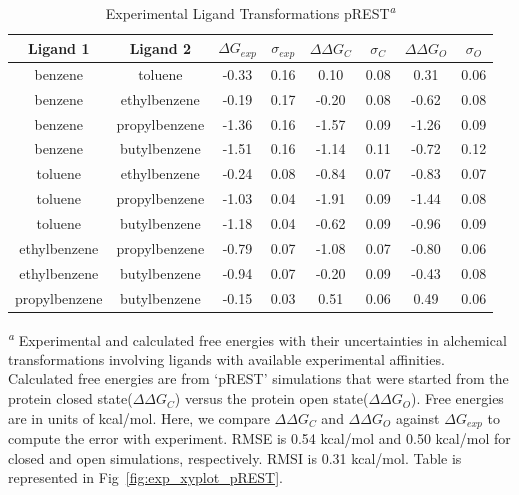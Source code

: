 \begin{table}[!htb]
\centering
\caption{Experimental Ligand Transformations pREST\textsuperscript{\emph{a}}}
\label{tbl:exp_pREST_set}
\begin{tabular}{|c|c|c|c|c|c|c|c|}
\hline
\textbf{Ligand 1} & \textbf{Ligand 2} & \boldmath$\Delta G_{exp}$  & \boldmath$\sigma_{exp}$ & \boldmath$\Delta\Delta G_{C}$ & \boldmath$\sigma_{C}$ & \boldmath$\Delta\Delta G_{O}$ & \boldmath$\sigma_{O}$ \\ \hline
benzene         & toluene         & -0.33 & 0.16  & 0.10  & 0.08  & 0.31  & 0.06          \\ \hline
benzene         & ethylbenzene    &-0.19  & 0.17  & -0.20 & 0.08  & -0.62 & 0.08          \\ \hline
benzene         & propylbenzene & -1.36 & 0.16  & -1.57 & 0.09  & -1.26 & 0.09         \\ \hline
benzene         & butylbenzene  & -1.51 & 0.16  & -1.14 & 0.11  & -0.72 & 0.12         \\ \hline
toluene         & ethylbenzene    & -0.24 & 0.08  & -0.84 & 0.07  & -0.83 & 0.07          \\ \hline
toluene         & propylbenzene & -1.03 & 0.04  & -1.91 & 0.09  & -1.44 & 0.08          \\ \hline
toluene         & butylbenzene  & -1.18 & 0.04  & -0.62 & 0.09  & -0.96 & 0.09          \\ \hline
ethylbenzene    & propylbenzene & -0.79 & 0.07  & -1.08 & 0.07  & -0.80 & 0.06         \\ \hline
ethylbenzene    & butylbenzene  & -0.94 & 0.07  & -0.20 & 0.09  & -0.43 & 0.08         \\ \hline
propylbenzene & butylbenzene  & -0.15 & 0.03  & 0.51  & 0.06  & 0.49  & 0.06       \\ \hline
\end{tabular}

\textsuperscript{\emph{a}} Experimental and calculated free energies with their uncertainties in alchemical transformations involving ligands with available experimental affinities.
Calculated free energies are from `pREST' simulations that were started from the protein closed state(\boldmath$\Delta\Delta G_{C}$) versus the protein open state(\boldmath$\Delta\Delta G_{O}$). 
Free energies are in units of kcal/mol.
Here, we compare \boldmath$\Delta\Delta G_{C}$ and \boldmath$\Delta\Delta G_{O}$ against \boldmath$\Delta G_{exp}$ to compute the error with experiment.
RMSE is 0.54 kcal/mol and 0.50 kcal/mol for closed and open simulations, respectively.
RMSI is 0.31 kcal/mol.
Table is represented in Fig~\ref{fig:exp_xyplot_pREST}.
\end{table}

